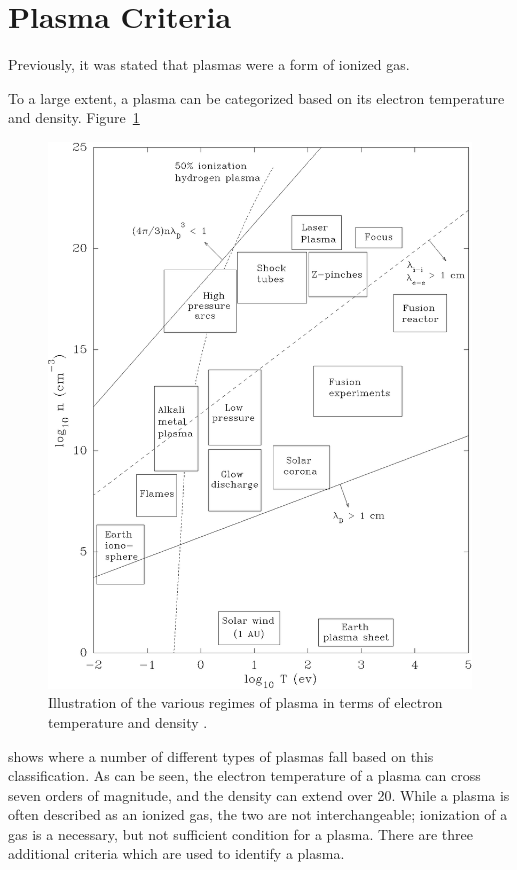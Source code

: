 \section{Plasma Criteria}
Previously, it was stated that plasmas were a form of ionized gas. 

To a large extent, a plasma can be categorized based on its electron
temperature and density. Figure~\ref{fig:regimes}
\begin{figure}
  \centering
  \includegraphics{./chapters/theory/figures/regimes.eps}
  \caption{Illustration of the various regimes of plasma in terms of
electron temperature and density \cite{Huba2011}.}
  \label{fig:regimes}
\end{figure}
shows where a number of different types of plasmas fall based on this
classification. As can be seen, the electron temperature of a plasma can
cross seven orders of magnitude, and the density can extend over 20.
While a plasma is often described as an ionized gas, the two are not
interchangeable; ionization of a gas is a necessary, but not sufficient
condition for a plasma. There are three additional criteria which are
used to identify a plasma.

